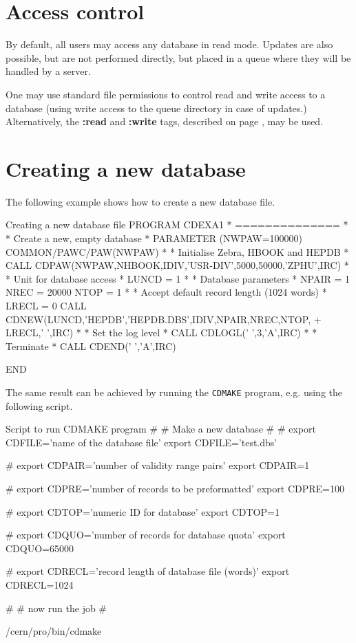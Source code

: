 \chapter{Access control}

By default, all users may access any database in read mode.
Updates are also possible, but are not performed directly,
but placed in a queue where they will be handled by a server.

One may use standard file permissions to control read and write
access to a database (using write access to the queue directory
in case of updates.) Alternatively, the {\bf :read} and {\bf :write}
tags, described on page \pageref{sect-NAMES}, may be used.

\chapter{Creating a new database}

The following example shows how to create a new database file.

\begin{XMPt}{Creating a new database file}
      PROGRAM CDEXA1
*     ==============
*
*     Create a new, empty database
*
      PARAMETER   (NWPAW=100000)
      COMMON/PAWC/PAW(NWPAW)
*
*     Initialise Zebra, HBOOK and HEPDB
*
      CALL CDPAW(NWPAW,NHBOOK,IDIV,'USR-DIV',5000,50000,'ZPHU',IRC)
*
*     Unit for database access
*
      LUNCD  = 1
*
*     Database parameters
*
      NPAIR  = 1
      NREC   = 20000
      NTOP   = 1
*
*     Accept default record length (1024 words)
*
      LRECL  = 0
      CALL CDNEW(LUNCD,'HEPDB','HEPDB.DBS',IDIV,NPAIR,NREC,NTOP,
     +           LRECL,' ',IRC)
*
*     Set the log level
*
      CALL CDLOGL(' ',3,'A',IRC)
*
*     Terminate
*
      CALL CDEND(' ','A',IRC)

      END
\end{XMPt}

The same result can be achieved by running the {\tt CDMAKE} program, e.g.
using the following script.

\begin{XMPt}{Script to run CDMAKE program}
#
# Make a new database
#
# export CDFILE='name of the database file'
  export CDFILE='test.dbs'

# export CDPAIR='number of validity range pairs'
  export CDPAIR=1

# export CDPRE='number of records to be preformatted'
  export CDPRE=100

# export CDTOP='numeric ID for database'
  export CDTOP=1

# export CDQUO='number of records for database quota'
  export CDQUO=65000

# export CDRECL='record length of database file (words)'
  export CDRECL=1024

#
# now run the job
#

  /cern/pro/bin/cdmake
\end{XMPt}
